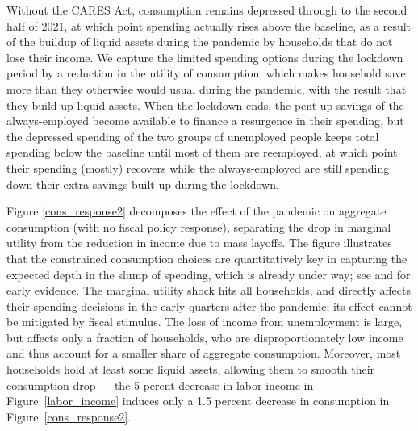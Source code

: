 \documentclass[titlepage]{\econtex}
\begin{document}
Without the CARES Act, consumption remains depressed through to the second half of 2021, at which point spending actually rises above the baseline, as a result of the buildup of liquid assets during the pandemic by households that do not lose their income.
We capture the limited spending options during the lockdown period by a reduction in the utility of consumption, which makes household save more than they otherwise would usual during the pandemic, with the result that they build up liquid assets.
When the lockdown ends, the pent up savings of the always-employed become available to finance a resurgence in their spending, but the depressed spending of the two groups of unemployed people keeps total spending below the baseline until most of them are reemployed, at which point their spending (mostly) recovers while the always-employed are still spending down their extra savings built up during the lockdown.

Figure \ref{cons_response2} decomposes the effect of the pandemic on aggregate consumption (with no fiscal policy response), separating the drop in marginal utility from the reduction in income due to mass layoffs.
The figure illustrates that the constrained consumption choices are quantitatively key in capturing the expected depth in the slump of spending, which is already under way; see \cite{baker_Cpandemic} and \cite{nyFedCoronaBlog} for early evidence.
The marginal utility shock hits all households, and directly affects their spending decisions in the early quarters after the pandemic; its effect cannot be mitigated by fiscal stimulus.
The loss of income from unemployment is large, but affects only a fraction of households, who are disproportionately low income and thus account for a smaller share of aggregate consumption.
Moreover, most households hold at least some liquid assets, allowing them to smooth their consumption drop --- the 5 perent  decrease in labor income in Figure~\ref{labor_income} induces only a 1.5 percent  decrease in consumption in Figure~\ref{cons_response2}.
\end{document}
